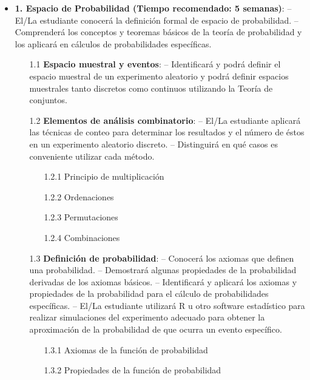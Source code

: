 \begin{itemize}

\item \textbf{1. Espacio de Probabilidad (Tiempo recomendado: 5 semanas)}: -- El/La estudiante conocer\'a la definici\'on formal de espacio de probabilidad. -- Comprender\'a los conceptos y teoremas b\'asicos de la teor\'ia de probabilidad y los aplicar\'a en c\'alculos de probabilidades espec\'ificas.

\begin{enumerate}
\item[1.1 ] \textbf{ Espacio muestral y eventos}: -- Identificar\'a y podr\'a definir el espacio muestral de un experimento aleatorio y podr\'a definir espacios muestrales tanto discretos como continuos utilizando la Teor\'ia de conjuntos.


\item[1.2 ] \textbf{Elementos de an\'alisis combinatorio}: -- El/La estudiante aplicar\'a las t\'ecnicas de conteo para determinar los resultados y el n\'umero de \'estos en un experimento aleatorio discreto. -- Distinguir\'a en qu\'e casos es conveniente utilizar cada m\'etodo.

\begin{enumerate}
\item[1.2.1 ] Principio de multiplicaci\'on
\item[1.2.2 ] Ordenaciones
\item[1.2.3 ] Permutaciones
\item[1.2.4 ] Combinaciones
\end{enumerate}

\item[1.3 ] \textbf{Definici\'on de probabilidad}: -- Conocer\'a los axiomas que definen una probabilidad. -- Demostrar\'a algunas propiedades de la probabilidad derivadas de los axiomas b\'asicos. -- Identificar\'a y aplicar\'a los axiomas y propiedades de la probabilidad para el c\'alculo de probabilidades espec\'ificas. -- El/La estudiante utilizar\'a R u otro software estad\'istico para realizar simulaciones del experimento adecuado para obtener la aproximaci\'on de la probabilidad de que ocurra un evento espec\'ifico.


\begin{enumerate}
\item[1.3.1 ] Axiomas de la funci\'on de probabilidad
\item[1.3.2 ] Propiedades de la funci\'on de probabilidad
\end{enumerate}


\end{enumerate}
\end{itemize}
